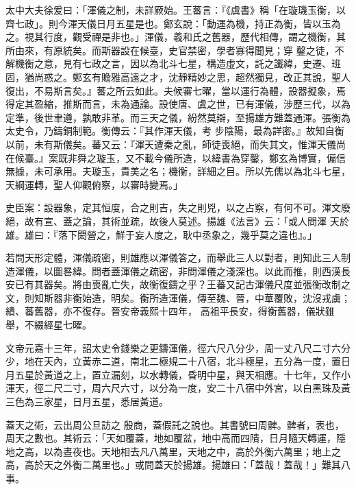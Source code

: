 \begin{pinyinscope}
 太中大夫徐爰曰：「渾儀之制，未詳厥始。王蕃言：『《虞書》稱「在璇璣玉衡，以齊七政」。則今渾天儀日月五星是也。鄭玄說：「動運為機，持正為衡，皆以玉為之。視其行度，觀受禪是非也。」渾儀，羲和氏之舊器，歷代相傳，謂之機衡，其所由來，有原統矣。而斯器設在候臺，史官禁密，學者寡得聞見；穿
 鑿之徒，不解機衡之意，見有七政之言，因以為北斗七星，構造虛文，託之讖緯，史遷、班固，猶尚惑之。鄭玄有贍雅高遠之才，沈靜精妙之思，超然獨見，改正其說，聖人復出，不易斯言矣。』蕃之所云如此。夫候審七曜，當以運行為體，設器擬象，焉得定其盈縮，推斯而言，未為通論。設使唐、虞之世，已有渾儀，涉歷三代，以為定準，後世聿遵，孰敢非革。而三天之儀，紛然莫辯，至揚雄方難蓋通渾。張衡為太史令，乃鑄銅制範。衡傳云：『其作渾天儀，考
 步陰陽，最為詳密。』故知自衡以前，未有斯儀矣。蕃又云：『渾天遭秦之亂，師徒喪絕，而失其文，惟渾天儀尚在候臺。』案既非舜之璇玉，又不載今儀所造，以緯書為穿鑿，鄭玄為博實，偏信無據，未可承用。夫璇玉，貴美之名；機衡，詳細之目。所以先儒以為北斗七星，天綱運轉，聖人仰觀俯察，以審時變焉。」



 史臣案：設器象，定其恒度，合之則吉，失之則兇，以之占察，有何不可。渾文廢絕，故有宣、蓋之論，其術並疏，故後人莫述。揚雄《法言》云：「或人問渾
 天於雄。雄曰：『落下閎營之，鮮于妄人度之，耿中丞象之，幾乎莫之違也』。」



 若問天形定體，渾儀疏密，則雄應以渾儀答之，而舉此三人以對者，則知此三人制造渾儀，以圖晷緯。問者蓋渾儀之疏密，非問渾儀之淺深也。以此而推，則西漢長安已有其器矣。將由喪亂亡失，故衡復鑄之乎？王蕃又記古渾儀尺度並張衡改制之文，則知斯器非衡始造，明矣。衡所造渾儀，傳至魏、晉，中華覆敗，沈沒戎虜；績、蕃舊器，亦不復存。晉安帝義熙十四年，
 高祖平長安，得衡舊器，儀狀雖舉，不綴經星七曜。



 文帝元嘉十三年，詔太史令錢樂之更鑄渾儀，徑六尺八分少，周一丈八尺二寸六分少，地在天內，立黃赤二道，南北二極規二十八宿，北斗極星，五分為一度，置日月五星於黃道之上，置立漏刻，以水轉儀，昏明中星，與天相應。十七年，又作小渾天，徑二尺二寸，周六尺六寸，以分為一度，安二十八宿中外宮，以白黑珠及黃三色為三家星，日月五星，悉居黃道。



 蓋天之術，云出周公旦訪之
 殷商，蓋假託之說也。其書號曰周髀。髀者，表也，周天之數也。其術云：「天如覆蓋，地如覆盆，地中高而四隤，日月隨天轉運，隱地之高，以為晝夜也。天地相去凡八萬里，天地之中，高於外衡六萬里；地上之高，高於天之外衡二萬里也。」或問蓋天於揚雄。揚雄曰：「蓋哉！蓋哉！」難其八事。




\end{pinyinscope}
